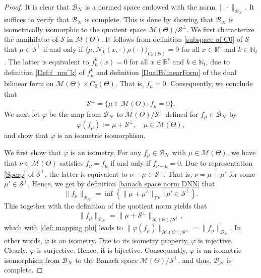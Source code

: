 \documentclass[11pt]{article}
\begin{document}
\begin{proof}
It is clear that $\mathcal{B}_{\mathcal{N}}$ is a normed space endowed with the norm $\|\cdot\|_{\mathcal{B}_{\mathcal{N}}}$. It suffices to verify that $\mathcal{B}_{\mathcal{N}}$ is complete. This is done by showing that $\mathcal{B}_{\mathcal{N}}$ is isometrically isomorphic to the  quotient space $\mathcal{M}(\Theta)/\mathcal{S}^\perp$.
We first characterize the annihilator of $\mathcal{S}$ in $\mathcal{M}(\Theta)$. It follows from definition \eqref{subspace of C0} of $\mathcal{S}$ that $\mu\in \mathcal{S}^\perp$ if and only if $\langle\mu,\mathcal{N}_k({x},\cdot)\rho(\cdot)\rangle_{C_0(\Theta)}=0$ for all $x\in \mathbb{R}^s$ and $k\in\mathbb{N}_t$. The latter is equivalent to $f_{\mu}^k(x)=0$ for all $x\in \mathbb{R}^s$ and $k\in\mathbb{N}_t$, due to definition \eqref{Def:f_mu^k} of $f_{\mu}^k$ and definition \eqref{DualBilinearForm} of the dual bilinear form on $\mathcal{M}(\Theta)\times C_0(\Theta)$. That is, $f_{\mu}=0$. Consequently, we conclude that
\begin{equation}\label{Sperp}
    \mathcal{S}^\perp=\{\mu\in\mathcal{M}(\Theta): f_{\mu}=0\}.
\end{equation}
We next let $\varphi$ be the map from $\mathcal{B}_{\mathcal{N}}$ to $\mathcal{M}(\Theta)/\mathcal{S}^\perp$ defined for $f_\mu\in \mathcal{B}_{\mathcal{N}}$ by 
\begin{equation}\label{def: mapping phi}\varphi(f_\mu):=\mu+\mathcal{S}^\perp, \quad\mu\in\mathcal{M}(\Theta),
\end{equation}
and show that $\varphi$ is an isometric isomorphism. 

%

We first show that $\varphi$ is an isometry. For any $f_{\mu}\in\mathcal{B}_\mathcal{N}$ with $\mu\in\mathcal{M}(\Theta)$, we have that $\nu\in\mathcal{M}(\Theta)$ satisfies $f_{\nu}=f_{\mu}$ if and only if $f_{\nu-\mu}=0$. Due to representation \eqref{Sperp} of $\mathcal{S}^\perp$, the latter is equivalent to $\nu-\mu\in \mathcal{S}^\perp$. That is, $\nu=\mu+\mu'$ for some $\mu'\in \mathcal{S}^\perp$. Hence, we get by definition \eqref{banach space norm DNN} that 
$$
\|f_{\mu}\|_{\mathcal{B}_{\mathcal{N}}}=\inf\left\{\|\mu+\mu'\|_{\mathrm{TV}}:\mu'\in \mathcal{S}^\perp\right\}.
$$
This together with the definition of the quotient norm yields that 
$$
\|f_{\mu}\|_{\mathcal{B}_{\mathcal{N}}}=\|\mu+\mathcal{S}^\perp\|_{\mathcal{M}(\Theta)/\mathcal{S}^\perp},
$$
which with \eqref{def: mapping phi} leads to $\|\varphi(f_{\mu})\|_{\mathcal{M}(\Theta)/\mathcal{S}^\perp}=\|f_{\mu}\|_{\mathcal{B}_{\mathcal{N}}}$. In other words, $\varphi$ is an isometry. Due to its isometry property,  $\varphi$ is injective. Clearly,  $\varphi$ is surjective. Hence, it is bijective.
Consequently, $\varphi$ is an isometric isomorphism from $\mathcal{B}_{\mathcal{N}}$ to the Banach space $\mathcal{M}(\Theta)/\mathcal{S}^\perp$, and thus, $\mathcal{B}_{\mathcal{N}}$ is complete.  


\end{proof}
\end{document}
